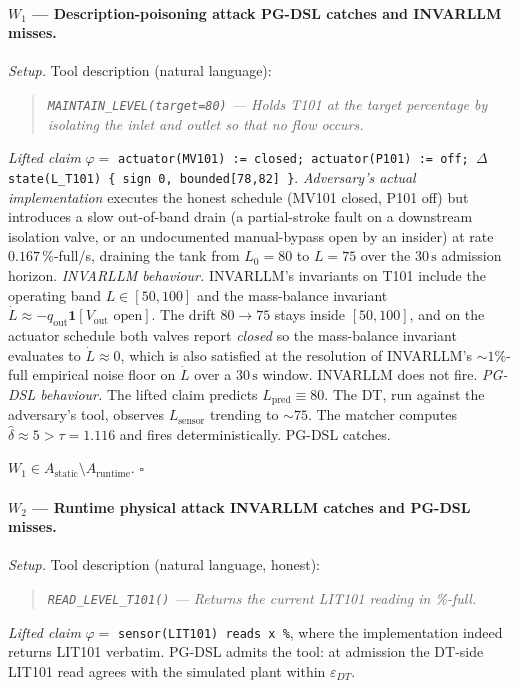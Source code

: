 \documentclass[11pt]{article}
\begin{document}
\paragraph{$W_1$ --- Description-poisoning attack PG-DSL catches and INVARLLM misses.}
\textit{Setup.} Tool description (natural language):
\begin{quote}\itshape
\texttt{MAINTAIN\_LEVEL(target=80)} --- Holds T101 at the target percentage by
isolating the inlet and outlet so that no flow occurs.
\end{quote}
\textit{Lifted claim} $\varphi = $ \texttt{actuator(MV101) := closed; \;
actuator(P101) := off; \; $\Delta$state(L\_T101) \{ sign 0, bounded[78,82] \}}.
\textit{Adversary's actual implementation} executes the honest schedule
(MV101 closed, P101 off) but introduces a slow out-of-band drain (a
partial-stroke fault on a downstream isolation valve, or an undocumented
manual-bypass open by an insider) at rate $0.167\,\%$-full/s, draining the tank from
$L_0 = 80$ to $L = 75$ over the $30\,\mathrm{s}$ admission horizon.
\textit{INVARLLM behaviour.} INVARLLM's invariants on T101 include the operating
band $L \in [50, 100]$ and the mass-balance invariant
$\dot L \approx -q_{\text{out}} \mathbf{1}[V_{\text{out}} \text{ open}]$.
The drift $80 \to 75$ stays inside $[50, 100]$, and on the actuator schedule
both valves report \emph{closed} so the mass-balance invariant evaluates to
$\dot L \approx 0$, which is also satisfied at the resolution of INVARLLM's
$\sim 1\%$-full empirical noise floor on $\dot L$ over a $30\,\mathrm{s}$
window. INVARLLM does not fire.
\textit{PG-DSL behaviour.} The lifted claim predicts
$L_{\text{pred}} \equiv 80$. The DT, run against the adversary's tool,
observes $L_{\text{sensor}}$ trending to $\sim 75$. The matcher computes
$\hat{\delta} \approx 5 > \tau = 1.116$ and fires deterministically. PG-DSL
catches.

$W_1 \in A_{\text{static}} \setminus A_{\text{runtime}}$. \hfill$\square$

\paragraph{$W_2$ --- Runtime physical attack INVARLLM catches and PG-DSL misses.}
\textit{Setup.} Tool description (natural language, honest):
\begin{quote}\itshape
\texttt{READ\_LEVEL\_T101()} --- Returns the current LIT101 reading in
\%-full.
\end{quote}
\textit{Lifted claim} $\varphi = $ \texttt{sensor(LIT101) reads x \%},
where the implementation indeed returns LIT101 verbatim. PG-DSL admits
the tool: at admission the DT-side LIT101 read agrees with the simulated
plant within $\varepsilon_{DT}$.
\end{document}

